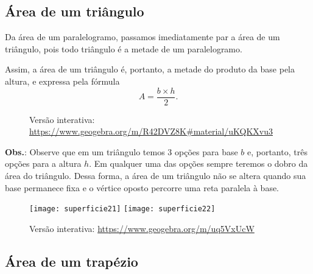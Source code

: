 \subsection{Área de um triângulo}

Da área de um paralelogramo, passamos imediatamente par a área de um triângulo, pois todo triângulo é a metade de um paralelogramo.

Assim, a área de um triângulo é, portanto, a metade do produto da base pela altura, e expressa pela fórmula 
\begin{equation*}
A=\frac{b\times h}{2}.
\end{equation*}

\begin{figure}[H]
\centering


\quad
{}


\caption{Versão interativa: \url{https://www.geogebra.org/m/R42DVZ8K\#material/uKQKXvu3}}
\end{figure}

\textbf{Obs.}: Observe que em um triângulo temos 3 opções para base $b$ e, portanto, três opções para a altura $h$. Em qualquer uma das opções sempre teremos o dobro da área do triângulo. Dessa forma, a área de um triângulo não se altera quando sua base permanece fixa e o vértice oposto percorre uma reta paralela à base.

\begin{figure}[H]
\centering

\texttt{[image: superficie21]}
\hspace{1em}
\texttt{[image: superficie22]}

\caption{Versão interativa: \url{https://www.geogebra.org/m/uq5VxUcW}}
\end{figure}

\subsection{ Área de um trapézio}

